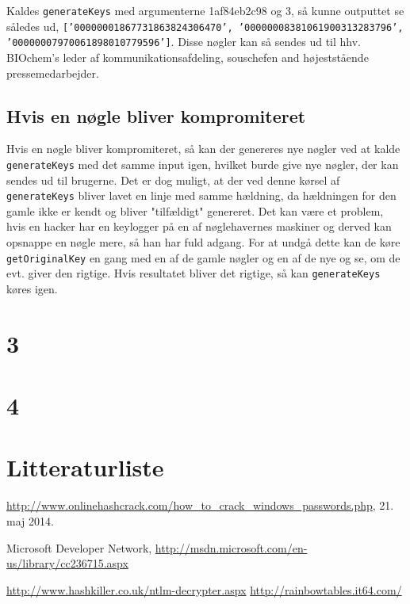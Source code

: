 \documentclass[10pt,a4paper,danish]{article}
\begin{document}
Kaldes \texttt{generateKeys} med argumenterne 1af84eb2c98 og 3, så kunne
outputtet se således ud, \texttt{['00000001867731863824306470', '00000008381061900313283796', '00000007970061898010779596']}.
Disse nøgler kan så sendes ud til hhv. BIOchem’s leder af kommunikationsafdeling,
souschefen and højeststående pressemedarbejder.

\subsection{Hvis en nøgle bliver kompromiteret}
Hvis en nøgle bliver kompromiteret, så kan der genereres nye nøgler ved at kalde
\texttt{generateKeys} med det samme input igen, hvilket burde give nye nøgler,
der kan sendes ud til brugerne.
Det er dog muligt, at der ved denne kørsel af \texttt{generateKeys} bliver lavet
en linje med samme hældning, da hældningen for den gamle ikke er kendt og bliver
"tilfældigt" genereret.
Det kan være et problem, hvis en hacker har en keylogger på en af nøglehavernes
maskiner og derved kan opsnappe en nøgle mere, så han har fuld adgang.
For at undgå dette kan de køre \texttt{getOriginalKey} en gang med en af de
gamle nøgler og en af de nye og se, om de evt. giver den rigtige. Hvis resultatet
bliver det rigtige, så kan \texttt{generateKeys} køres igen.

\section{3}

\section{4}

\section{Litteraturliste}

\begin{thebibliography}{9}

  \url{http://www.onlinehashcrack.com/how_to_crack_windows_passwords.php}, 21.
  maj 2014.

 Microsoft Developer Network,
  \url{http://msdn.microsoft.com/en-us/library/cc236715.aspx}

 \url{http://www.hashkiller.co.uk/ntlm-decrypter.aspx}
 \url{http://rainbowtables.it64.com/}

\end{thebibliography}
\end{document}

